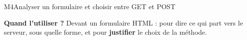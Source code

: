 \begin{fichemethode}{M4}{Analyser un formulaire et choisir entre GET et POST}

\textbf{Quand l'utiliser ?} Devant un formulaire HTML : pour dire ce qui part vers le serveur,
sous quelle forme, et pour \textbf{justifier} le choix de la méthode.


\end{fichemethode}
